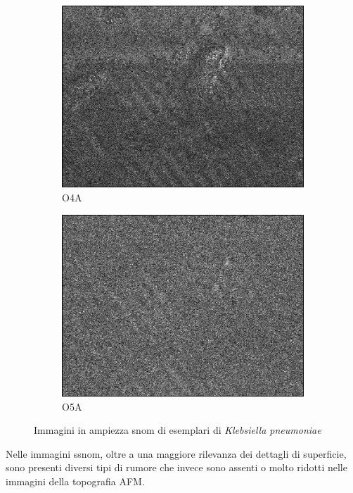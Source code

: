 \documentclass[../main.tex]{subfiles}
\begin{document}
\begin{figure}[ht]
\begin{subfigure}{0.32\linewidth}
		\includegraphics[keepaspectratio, width=\linewidth]{images/kp_o4a.png}
		\caption{O4A}
	\end{subfigure}
	\begin{subfigure}{0.32\linewidth}
		\centering
		\includegraphics[keepaspectratio, width=\linewidth]{images/kp_o5a.png}
		\caption{O5A}
	\end{subfigure}
	\caption[Immagini in ampiezza SNOM di esemplari di \textit{Klebsiella pneumoniae}]{
		Immagini in ampiezza \acrshort{snom} di esemplari di \textit{Klebsiella pneumoniae} \cite{ssnombacter_data}}
\end{figure}

Nelle immagini \acrshort{ssnom}, oltre a una maggiore rilevanza dei dettagli di superficie, sono presenti diversi tipi di rumore  che invece sono assenti o molto ridotti nelle immagini della topografia AFM.
\end{document}
